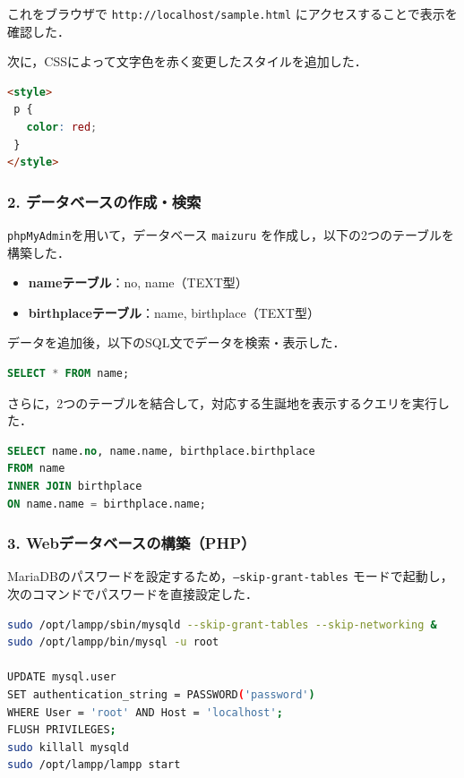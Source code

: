 これをブラウザで \texttt{http://localhost/sample.html} にアクセスすることで表示を確認した．

次に，CSSによって文字色を赤く変更したスタイルを追加した．

\begin{lstlisting}[language=html]
<style>
 p {
   color: red;
 }
</style>
\end{lstlisting}

\subsubsection*{2. データベースの作成・検索}

\texttt{phpMyAdmin}を用いて，データベース \texttt{maizuru} を作成し，以下の2つのテーブルを構築した．

\vspace{0.5zh}
\begin{itemize}
  \item \textbf{nameテーブル}：no, name（TEXT型）
  \item \textbf{birthplaceテーブル}：name, birthplace（TEXT型）
\end{itemize}

データを追加後，以下のSQL文でデータを検索・表示した．

\begin{lstlisting}[language=SQL]
SELECT * FROM name;
\end{lstlisting}

さらに，2つのテーブルを結合して，対応する生誕地を表示するクエリを実行した．

\begin{lstlisting}[language=SQL]
SELECT name.no, name.name, birthplace.birthplace 
FROM name 
INNER JOIN birthplace 
ON name.name = birthplace.name;
\end{lstlisting}

\subsubsection*{3. Webデータベースの構築（PHP）}

MariaDBのパスワードを設定するため，\texttt{--skip-grant-tables} モードで起動し，次のコマンドでパスワードを直接設定した．

\begin{lstlisting}[language=bash]
sudo /opt/lampp/sbin/mysqld --skip-grant-tables --skip-networking &
sudo /opt/lampp/bin/mysql -u root

UPDATE mysql.user 
SET authentication_string = PASSWORD('password') 
WHERE User = 'root' AND Host = 'localhost';
FLUSH PRIVILEGES;
sudo killall mysqld
sudo /opt/lampp/lampp start
\end{lstlisting}

